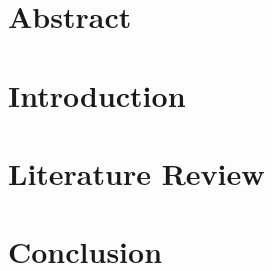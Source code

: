 \documentclass[11pt]{book}
\renewcommand{\baselinestretch}{1.2}
\begin{document}


\newpage
\thispagestyle{empty}
\renewcommand{\thesisdedication}{{\large Copyright \copyright~Firstname Lastname, 2023\\}{\large All Rights Reserved\\}}
\thesisdedicationpage


\mastersthesis
%
\chapter*{Abstract}
\label{ch:abstract}

%
\tableofcontents
\listoffigures
\let\cleardoublepage\clearpage
\listoftables
\printglossary[type=\acronymtype,title=Abbreviations,nonumberlist]
\printunsrtglossary[type=symbols]

% 

\chapter{Introduction}
\label{ch:intro}


\chapter{Literature Review}
\label{ch:literature review}



\chapter{Conclusion}
\label{ch:conc}



{}
\end{document}
